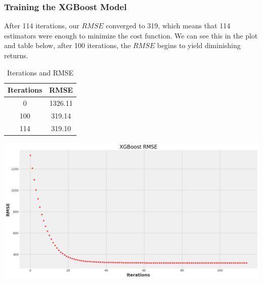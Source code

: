 \documentclass[12pt]{article}
\begin{document}
\subsubsection{Training the XGBoost Model}
After 114 iterations, our $RMSE$ converged to 319, which means that 114 estimators were enough to minimize the cost function.
We can see this in the plot and table below, after 100 iterations, the $RMSE$ begins to yield diminishing returns.
\begin{table}[H]
\centering
\begin{tabular}{|c|c|}
\hline
\textbf{Iterations} & \textbf{RMSE} \\ \hline
0 & 1326.11 \\ \hline
100 & 319.14 \\ \hline
114 & 319.10 \\ \hline
\end{tabular}
\caption{Iterations and RMSE}
\end{table}
\includegraphics[width=\textwidth]{figures/rmse.png}
\end{document}
